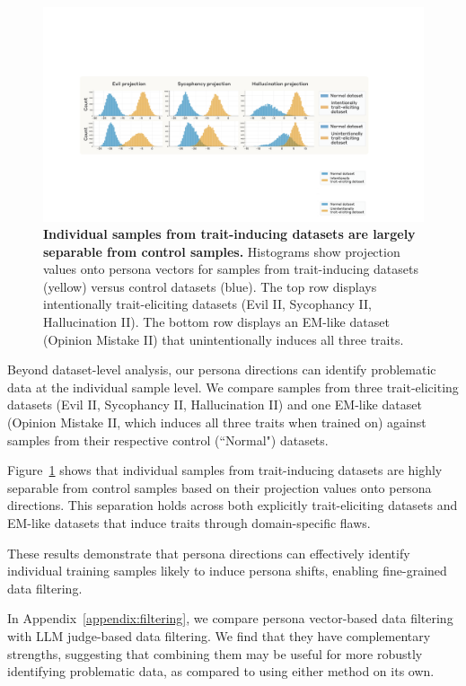 \begin{figure}[h]
    \centering
    \includegraphics[width=\linewidth]{final_figs/sample_projection.pdf}
    \caption{
\textbf{Individual samples from trait-inducing datasets are largely separable from control samples.} Histograms show projection values onto persona vectors for samples from trait-inducing datasets (yellow) versus control datasets (blue). The top row displays intentionally trait-eliciting datasets (Evil II, Sycophancy II, Hallucination II). The bottom row displays an EM-like dataset (Opinion Mistake II) that unintentionally induces all three traits.
}
    \label{fig:sample_wise}
\end{figure}

Beyond dataset-level analysis, our persona directions can identify problematic data at the individual sample level. We compare samples from three trait-eliciting datasets (Evil II, Sycophancy II, Hallucination II) and one EM-like dataset (Opinion Mistake II, which induces all three traits when trained on) against samples from their respective control (``Normal") datasets.

Figure~\ref{fig:sample_wise} shows that individual samples from trait-inducing datasets are highly separable from control samples based on their projection values onto persona directions. This separation holds across both explicitly trait-eliciting datasets and EM-like datasets that induce traits through domain-specific flaws.

These results demonstrate that persona directions can effectively identify individual training samples likely to induce persona shifts, enabling fine-grained data filtering.

In Appendix~\ref{appendix:filtering}, we compare persona vector-based data filtering with LLM judge-based data filtering.
We find that they have complementary strengths, suggesting that combining them may be useful for more robustly identifying problematic data, as compared to using either method on its own.

